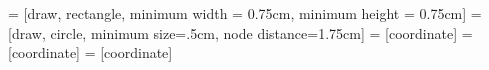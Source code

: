 \usetikzlibrary{shapes, fit, arrows}

 = [draw, rectangle, minimum width = 0.75cm, minimum height = 0.75cm]
 = [draw, circle, minimum size=.5cm, node distance=1.75cm]
 = [coordinate]
 = [coordinate]
 = [coordinate]